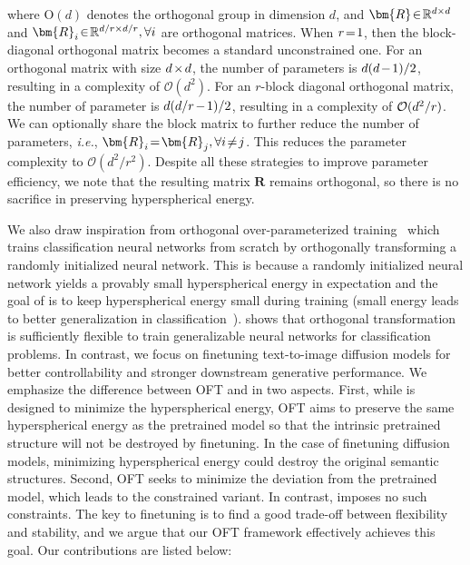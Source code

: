 \begin{itemize}[leftmargin=*,nosep]
where $\text{O}(d)$ denotes the orthogonal group in dimension $d$, and $\thickmuskip=2mu \medmuskip=2mu \bm{R}\in\mathbb{R}^{d\times d}$ and $\thickmuskip=2mu \medmuskip=2mu \bm{R}_i\in\mathbb{R}^{d/r\times d/r},\forall i$ are orthogonal matrices. When $\thickmuskip=2mu \medmuskip=2mu r=1$, then the block-diagonal orthogonal matrix becomes a standard unconstrained one. For an orthogonal matrix with size $\thickmuskip=2mu \medmuskip=2mu d\times d$, the number of parameters is $\thickmuskip=2mu \medmuskip=2mu d(d-1)/2$, resulting in a complexity of $\mathcal{O}(d^2)$. For an $r$-block diagonal orthogonal matrix, the number of parameter is $\thickmuskip=2mu \medmuskip=2mu d(d/r-1)/2$, resulting in a complexity of $\thickmuskip=2mu \medmuskip=2mu \mathcal{O}(d^2/r)$. We can optionally share the block matrix to further reduce the number of parameters, \emph{i.e.}, $\thickmuskip=2mu \medmuskip=2mu\bm{R}_i=\bm{R}_j,\forall i\neq j$. This reduces the parameter complexity to $\mathcal{O}(d^2/r^2)$.  Despite all these strategies to improve parameter efficiency, we note that the resulting matrix $\bm{R}$ remains orthogonal, so there is no sacrifice in preserving hyperspherical energy.

We also draw inspiration from orthogonal over-parameterized training~\cite{liu2021orthogonal} which trains classification neural networks from scratch by orthogonally transforming a randomly initialized neural network. This is because a randomly initialized neural network yields a provably small hyperspherical energy in expectation and the goal of \cite{liu2021orthogonal} is to keep hyperspherical energy small during training (small energy leads to better generalization in classification~\cite{liu2018learning,lin2020regularizing}). \cite{liu2021orthogonal} shows that orthogonal transformation is sufficiently flexible to train generalizable neural networks for classification problems. In contrast, we focus on finetuning text-to-image diffusion models for better controllability and stronger downstream generative performance. We emphasize the difference between OFT and \cite{liu2021orthogonal} in two aspects. First, while \cite{liu2021orthogonal} is designed to minimize the hyperspherical energy, OFT aims to preserve the same hyperspherical energy as the pretrained model so that the intrinsic pretrained structure will not be destroyed by finetuning. In the case of finetuning diffusion models, minimizing hyperspherical energy could destroy the original semantic structures. Second, OFT seeks to minimize the deviation from the pretrained model, which leads to the constrained variant. In contrast, \cite{liu2021orthogonal} imposes no such constraints. The key to finetuning is to find a good trade-off between flexibility and stability, and we argue that our OFT framework effectively achieves this goal. Our contributions are listed below:


\end{itemize}
